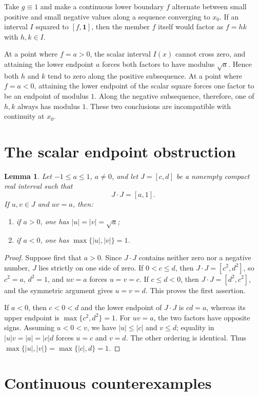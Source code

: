 \documentclass[11pt]{article}
\newtheorem{lemma}{Lemma}
\newcommand{\one}{\mathbf 1}
\begin{document}
Take $g\equiv1$ and make a continuous lower boundary $f$ alternate between
small positive and small negative values along a sequence converging to
$x_0$.  If an interval $I$ squared to $[f,\one]$, then the member $f$ itself
would factor as $f=hk$ with $h,k\in I$.

At a point where $f=a>0$, the scalar interval $I(x)$ cannot cross zero, and
attaining the lower endpoint $a$ forces both factors to have modulus
$\sqrt a$.  Hence both $h$ and $k$ tend to zero along the positive
subsequence.  At a point where $f=a<0$, attaining the lower endpoint of the
scalar square forces one factor to be an endpoint of modulus $1$.  Along the
negative subsequence, therefore, one of $h,k$ always has modulus $1$.  These
two conclusions are incompatible with continuity at $x_0$.

\section{The scalar endpoint obstruction}

\begin{lemma}\label{lem:scalar}
Let $-1\leq a\leq1$, $a\neq0$, and let $J=[c,d]$ be a nonempty compact real
interval such that
\[
 J\cdot J=[a,1].
\]
If $u,v\in J$ and $uv=a$, then:
\begin{enumerate}
\item if $a>0$, one has $|u|=|v|=\sqrt a$;
\item if $a<0$, one has $\max\{|u|,|v|\}=1$.
\end{enumerate}
\end{lemma}

\begin{proof}
Suppose first that $a>0$.  Since $J\cdot J$ contains neither zero nor a
negative number, $J$ lies strictly on one side of zero.  If $0<c\leq d$,
then $J\cdot J=[c^2,d^2]$, so $c^2=a$, $d^2=1$, and $uv=a$ forces
$u=v=c$.  If $c\leq d<0$, then $J\cdot J=[d^2,c^2]$, and the symmetric
argument gives $u=v=d$.  This proves the first assertion.

If $a<0$, then $c<0<d$ and the lower endpoint of $J\cdot J$ is $cd=a$,
whereas its upper endpoint is $\max\{c^2,d^2\}=1$.  For $uv=a$, the two
factors have opposite signs.  Assuming $u<0<v$, we have
$|u|\leq|c|$ and $v\leq d$; equality in
$|u|v=|a|=|c|d$ forces $u=c$ and $v=d$.  The other ordering is identical.
Thus $\max\{|u|,|v|\}=\max\{|c|,d\}=1$.
\end{proof}

\section{Continuous counterexamples}
\end{document}
